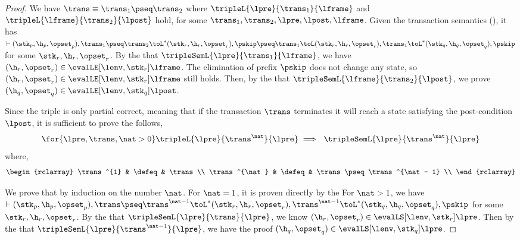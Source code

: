 \begin{proof}
We have \( \trans \equiv \trans_{1} \pseq \trans_{2} \) where \( \tripleL{\lpre}{\trans_{1}}{\lframe} \) and \( \tripleL{\lframe}{\trans_{2}}{\lpost} \) hold, for some \( \trans_{1}, \trans_{2}, \lpre, \lpost, \lframe \).
Given the transaction semantics (), it has \( \vdash ( \stk_{p}, \h_{p}, \opset_{p} ), \trans_{1} \pseq \trans_{2} \toL^{*} ( \stk_{r}, \h_{r}, \opset_{r} ), \pskip \pseq \trans_{1} \toL ( \stk_{r}, \h_{r}, \opset_{r} ), \trans_{1} \toL^{*} ( \stk_{q}, \h_{q}, \opset_{q} ), \pskip \) for some \( \stk_{r}, \h_{r}, \opset_{r} \).
By the \ih that \( \tripleSemL{\lpre}{\trans_{1}}{\lframe} \), we have \( (\h_{r}, \opset_{r}) \in \evalLE[\lenv, \stk_{r}]{\lframe} \).
The elimination of prefix \( \pskip\) does not change any state, so \( (\h_{r}, \opset_{r}) \in \evalLE[\lenv, \stk_{r}]{\lframe} \) still holds.
Then, by the \ih that \( \tripleSemL{\lframe}{\trans_{2}}{\lpost} \), we prove \( (\h_{q}, \opset_{q}) \in \evalLE[\lenv, \stk_{q}]{\lpost} \).


Since the triple is only partial correct, meaning that if the transaction \( \trans \) terminates it will reach a state satisfying the post-condition \( \lpost \), it is sufficient to prove the follows,
\[
    \for{\lpre, \trans, \nat > 0} \tripleL{\lpre}{\trans^{\nat}}{\lpre} \implies \ \tripleSemL{\lpre}{\trans^{\nat}}{\lpre} \\
\]
where,
\[
\begin{rclarray}
    \trans^{1} & \defeq  & \trans \\
    \trans^{\nat} & \defeq  & \trans \pseq \trans^{\nat - 1} \\
\end{rclarray}
\]

We prove that by induction on the number \( \nat \).
For \( \nat = 1 \), it is proven directly by the \ih
For \( \nat > 1 \), we have \( \vdash (\stk_{p}, \h_{p}, \opset_{p}), \trans \pseq \trans^{\nat - 1} \toL^{*} (\stk_{r}, \h_{r}, \opset_{r}), \trans^{\nat - 1} \toL^{*} (\stk_{q}, \h_{q}, \opset_{q}), \pskip \) for some \( \stk_{r}, \h_{r}, \opset_{r} \).
By the \ih that \(\tripleSemL{\lpre}{\trans}{\lpre} \), we know \(  (\h_{r}, \opset_{r}) \in \evalLS[\lenv, \stk_{r}]{\lpre} \).
Then by the \ih that \(\tripleSemL{\lpre}{\trans^{\nat - 1}}{\lpre} \), we have the proof \(  (\h_{q}, \opset_{q}) \in \evalLS[\lenv, \stk_{q}]{\lpre} \).



\end{proof}
